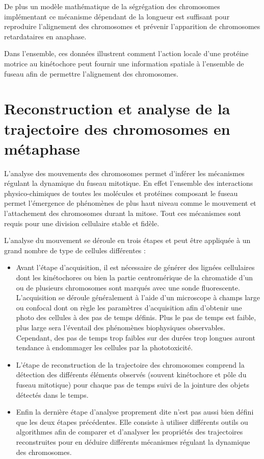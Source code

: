 \documentclass[12pt,a4paper,twoside,openright]{book}
\begin{document}
De plus un modèle mathématique de la ségrégation des chromosomes
implémentant ce mécanisme dépendant de la longueur est suffisant pour
reproduire l'alignement des chromosomes et prévenir l'apparition de
chromosomes retardataires en anaphase.

Dans l'ensemble, ces données illustrent comment l'action locale d'une
protéine motrice au kinétochore peut fournir une information spatiale à
l'ensemble de fuseau afin de permettre l'alignement des chromosomes.





\section{Reconstruction et analyse de la trajectoire des chromosomes en
métaphase}\label{reconstruction-et-analyse-de-la-trajectoire-des-chromosomes-en-muxe9taphase}

L'analyse des mouvements des chromosomes permet d'inférer les mécanismes
régulant la dynamique du fuseau mitotique. En effet l'ensemble des
interactions physico-chimiques de toutes les molécules et protéines
composant le fuseau permet l'émergence de phénomènes de plus haut niveau
comme le mouvement et l'attachement des chromosomes durant la mitose.
Tout ces mécanismes sont requis pour une division cellulaire stable et
fidèle.

L'analyse du mouvement se déroule en trois étapes et peut être appliquée
à un grand nombre de type de cellules différentes :

\begin{itemize}
\item
  Avant l'étape d'acquisition, il est nécessaire de générer des lignées
  cellulaires dont les kinétochores ou bien la partie centromérique de
  la chromatide d'un ou de plusieurs chromosomes sont marqués avec une
  sonde fluorescente. L'acquisition se déroule généralement à l'aide
  d'un microscope à champs large ou confocal dont on règle les
  paramètres d'acquisition afin d'obtenir une photo des cellules à des
  pas de temps définis. Plus le pas de temps est faible, plus large sera
  l'éventail des phénomènes biophysiques observables. Cependant, des pas
  de temps trop faibles sur des durées trop longues auront tendance à
  endommager les cellules par la phototoxicité.
\item
  L'étape de reconstruction de la trajectoire des chromosomes comprend
  la détection des différents éléments observés (souvent kinétochore et
  pôle du fuseau mitotique) pour chaque pas de temps suivi de la
  jointure des objets détectés dans le temps.
\item
  Enfin la dernière étape d'analyse proprement dite n'est pas aussi bien
  défini que les deux étapes précédentes. Elle consiste à utiliser
  différents outils ou algorithmes afin de comparer et d'analyser les
  propriétés des trajectoires reconstruites pour en déduire différents
  mécanismes régulant la dynamique des chromosomes.
\end{itemize}
\end{document}
